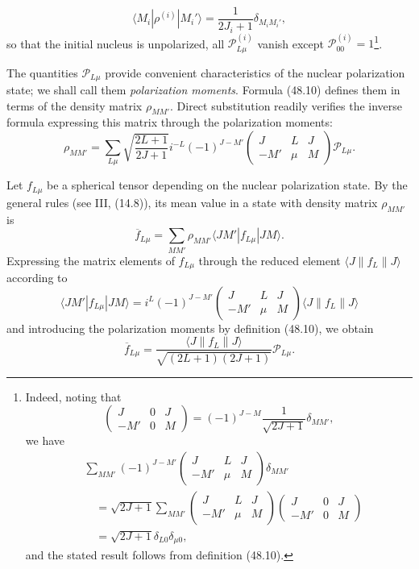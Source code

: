 \[
\langle M_i|\rho^{(i)}|M_i'\rangle
=\frac1{2J_i+1}\delta_{M_iM_i'},
\]
so that the initial nucleus is unpolarized, all $\mathcal P_{L\mu}^{(i)}$ vanish except $\mathcal P_{00}^{(i)}=1$\footnote{Indeed, noting that
\[
\begin{pmatrix}J&0&J\\-M'&0&M\end{pmatrix}
=(-1)^{J-M}\frac1{\sqrt{2J+1}}\delta_{MM'},
\]
we have
\[
\begin{aligned}
&\sum_{MM'}(-1)^{J-M'}
\begin{pmatrix}J&L&J\\-M'&\mu&M\end{pmatrix}\delta_{MM'}\\
&\quad=\sqrt{2J+1}\sum_{MM'}
\begin{pmatrix}J&L&J\\-M'&\mu&M\end{pmatrix}
\begin{pmatrix}J&0&J\\-M'&0&M\end{pmatrix}\\
&\quad=\sqrt{2J+1}\delta_{L0}\delta_{\mu0},
\end{aligned}
\]
and the stated result follows from definition (48.10).}.

The quantities $\mathcal P_{L\mu}$ provide convenient characteristics of the nuclear polarization state; we shall call them \emph{polarization moments}. Formula (48.10) defines them in terms of the density matrix $\rho_{MM'}$. Direct substitution readily verifies the inverse formula expressing this matrix through the polarization moments:
\begin{equation}
\rho_{MM'}=\sum_{L\mu}\sqrt{\frac{2L+1}{2J+1}}i^{-L}(-1)^{J-M'}
\begin{pmatrix}J&L&J\\-M'&\mu&M\end{pmatrix}\mathcal P_{L\mu}.
\tag{48.12}
\end{equation}

Let $f_{L\mu}$ be a spherical tensor depending on the nuclear polarization state. By the general rules (see III, (14.8)), its mean value in a state with density matrix $\rho_{MM'}$ is
\begin{equation}
\overline f_{L\mu}=\sum_{MM'}\rho_{MM'}\langle JM'|f_{L\mu}|JM\rangle.
\tag{48.13}
\end{equation}
Expressing the matrix elements of $f_{L\mu}$ through the reduced element $\langle J\|f_L\|J\rangle$ according to
\[
\langle JM'|f_{L\mu}|JM\rangle
=i^L(-1)^{J-M'}
\begin{pmatrix}J&L&J\\-M'&\mu&M\end{pmatrix}
\langle J\|f_L\|J\rangle
\]
and introducing the polarization moments by definition (48.10), we obtain
\begin{equation}
\overline f_{L\mu}=\frac{\langle J\|f_L\|J\rangle}
{\sqrt{(2L+1)(2J+1)}}\mathcal P_{L\mu}.
\tag{48.14}
\end{equation}

